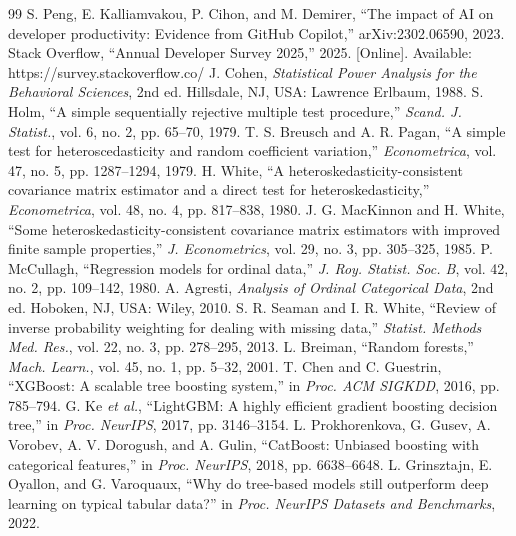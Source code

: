 \documentclass[conference]{IEEEtran}
\begin{document}
\begin{thebibliography}{99}
 S. Peng, E. Kalliamvakou, P. Cihon, and M. Demirer, ``The impact of AI on developer productivity: Evidence from GitHub Copilot,'' arXiv:2302.06590, 2023.
 Stack Overflow, ``Annual Developer Survey 2025,'' 2025. [Online]. Available: https://survey.stackoverflow.co/
 J. Cohen, \emph{Statistical Power Analysis for the Behavioral Sciences}, 2nd ed. Hillsdale, NJ, USA: Lawrence Erlbaum, 1988.
 S. Holm, ``A simple sequentially rejective multiple test procedure,'' \emph{Scand. J. Statist.}, vol. 6, no. 2, pp. 65--70, 1979.
 T. S. Breusch and A. R. Pagan, ``A simple test for heteroscedasticity and random coefficient variation,'' \emph{Econometrica}, vol. 47, no. 5, pp. 1287--1294, 1979.
 H. White, ``A heteroskedasticity-consistent covariance matrix estimator and a direct test for heteroskedasticity,'' \emph{Econometrica}, vol. 48, no. 4, pp. 817--838, 1980.
 J. G. MacKinnon and H. White, ``Some heteroskedasticity-consistent covariance matrix estimators with improved finite sample properties,'' \emph{J. Econometrics}, vol. 29, no. 3, pp. 305--325, 1985.
 P. McCullagh, ``Regression models for ordinal data,'' \emph{J. Roy. Statist. Soc. B}, vol. 42, no. 2, pp. 109--142, 1980.
 A. Agresti, \emph{Analysis of Ordinal Categorical Data}, 2nd ed. Hoboken, NJ, USA: Wiley, 2010.
 S. R. Seaman and I. R. White, ``Review of inverse probability weighting for dealing with missing data,'' \emph{Statist. Methods Med. Res.}, vol. 22, no. 3, pp. 278--295, 2013.
 L. Breiman, ``Random forests,'' \emph{Mach. Learn.}, vol. 45, no. 1, pp. 5--32, 2001.
 T. Chen and C. Guestrin, ``XGBoost: A scalable tree boosting system,'' in \emph{Proc. ACM SIGKDD}, 2016, pp. 785--794.
 G. Ke \emph{et al.}, ``LightGBM: A highly efficient gradient boosting decision tree,'' in \emph{Proc. NeurIPS}, 2017, pp. 3146--3154.
 L. Prokhorenkova, G. Gusev, A. Vorobev, A. V. Dorogush, and A. Gulin, ``CatBoost: Unbiased boosting with categorical features,'' in \emph{Proc. NeurIPS}, 2018, pp. 6638--6648.
 L. Grinsztajn, E. Oyallon, and G. Varoquaux, ``Why do tree-based models still outperform deep learning on typical tabular data?'' in \emph{Proc. NeurIPS Datasets and Benchmarks}, 2022.

\end{thebibliography}
\end{document}
